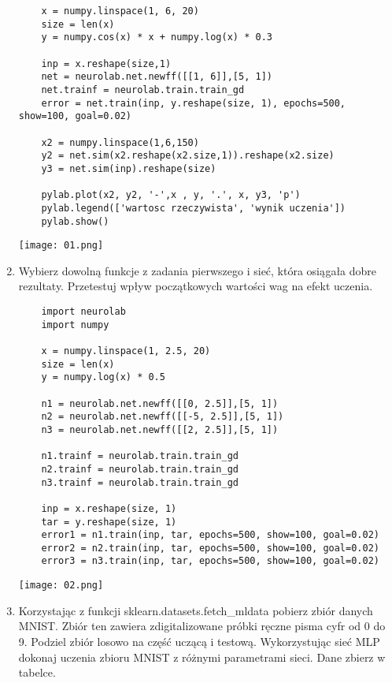 \documentclass[12pt,a4paper]{article}
\begin{document}
\begin{enumerate}
\begin{verbatim}
    x = numpy.linspace(1, 6, 20)
    size = len(x)
    y = numpy.cos(x) * x + numpy.log(x) * 0.3
     
    inp = x.reshape(size,1)
    net = neurolab.net.newff([[1, 6]],[5, 1])
    net.trainf = neurolab.train.train_gd
    error = net.train(inp, y.reshape(size, 1), epochs=500, show=100, goal=0.02)
     
    x2 = numpy.linspace(1,6,150)
    y2 = net.sim(x2.reshape(x2.size,1)).reshape(x2.size)
    y3 = net.sim(inp).reshape(size)
     
    pylab.plot(x2, y2, '-',x , y, '.', x, y3, 'p')
    pylab.legend(['wartosc rzeczywista', 'wynik uczenia'])
    pylab.show()
                    \end{verbatim}
            \texttt{[image: 01.png]}
            \\
            \noindent{}
            \noindent{}
            \noindent{}
     
            \item Wybierz dowolną funkcje z zadania pierwszego i sieć, która osiągała dobre rezultaty. Przetestuj wpływ początkowych wartości wag na efekt uczenia.
                    \begin{verbatim}
    import neurolab
    import numpy
     
    x = numpy.linspace(1, 2.5, 20)
    size = len(x)
    y = numpy.log(x) * 0.5
     
    n1 = neurolab.net.newff([[0, 2.5]],[5, 1])
    n2 = neurolab.net.newff([[-5, 2.5]],[5, 1])
    n3 = neurolab.net.newff([[2, 2.5]],[5, 1])
     
    n1.trainf = neurolab.train.train_gd
    n2.trainf = neurolab.train.train_gd
    n3.trainf = neurolab.train.train_gd
     
    inp = x.reshape(size, 1)
    tar = y.reshape(size, 1)
    error1 = n1.train(inp, tar, epochs=500, show=100, goal=0.02)
    error2 = n2.train(inp, tar, epochs=500, show=100, goal=0.02)
    error3 = n3.train(inp, tar, epochs=500, show=100, goal=0.02)
                    \end{verbatim}
            \texttt{[image: 02.png]}
            \item Korzystając z funkcji sklearn.datasets.fetch\_mldata pobierz zbiór danych MNIST. Zbiór ten zawiera zdigitalizowane próbki ręczne pisma cyfr od 0 do 9. Podziel zbiór losowo na część uczącą i testową. Wykorzystując sieć MLP dokonaj uczenia zbioru MNIST z różnymi parametrami sieci. Dane zbierz w tabelce.
           

\end{enumerate}
\end{document}
